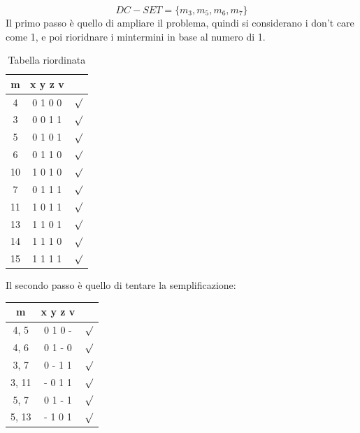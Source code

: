\documentclass[a4paper]{article}
\theoremstyle{break}
\theoremstyle{break}
\theoremstyle{break}
\theoremstyle{break}
\begin{document}
\begin{example}
        \[
        DC-SET = \{ m_3,m_5,m_6,m_7 \}
        \] 
        Il primo passo è quello di ampliare il problema, quindi si considerano i
        don't care come 1, e poi rioridnare i mintermini in base al numero di 1.
        \begin{table}[H]
            \begin{center}
                \begin{tabular}{c|c|c}
                    m & x y z v &\\
                    \hline
                    4 & 0 1 0 0 & \( \surd \) \\
                    \hline
                    3 & 0 0 1 1 &\( \surd \) \\
                    5 & 0 1 0 1 &\( \surd \) \\
                    6 & 0 1 1 0 &\( \surd \) \\
                    10 & 1 0 1 0&\( \surd \) \\
                    \hline
                    7 & 0 1 1 1&\( \surd \) \\
                    11 & 1 0 1 1&\( \surd \) \\
                    13 & 1 1 0 1&\( \surd \) \\
                    14 & 1 1 1 0&\( \surd \) \\
                    \hline
                    15 & 1 1 1 1&\( \surd \) \\
                \end{tabular}
            \end{center}
            \caption{Tabella riordinata}
        \end{table}
        Il secondo passo è quello di tentare la semplificazione:
        \begin{table}[H]
            \begin{center}
                \begin{tabular}{c|c|c}
                    m & x y z v& \\
                    \hline
                    4, 5 & 0 1 0 -& \( \surd \) \\
                    4, 6 & 0 1 - 0& \( \surd \) \\
                    \hline
                    3, 7 & 0 - 1 1& \( \surd \) \\
                    3, 11 & - 0 1 1& \( \surd \) \\
                    5, 7 & 0 1 - 1& \( \surd \) \\
                    5, 13 & - 1 0 1& \( \surd \) \\

\end{tabular}
\end{center}
\end{table}
\end{example}
\end{document}

